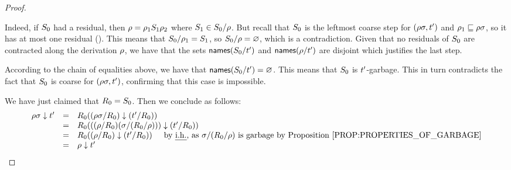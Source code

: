 \begin{proof}
\begin{enumerate}
  Indeed, if $S_0$ had a residual, then $\rho = \rho_1S_1\rho_2$ where $S_1 \in S_0/\rho$.
  But recall that $S_0$ is the leftmost coarse step for $(\rho\sigma,t')$ and
  $\rho_1 \sqsubseteq \rho\sigma$, so it has at most one residual ().
  This means that $S_0/\rho_1 = S_1$, so $S_0/\rho = \varnothing$, which is a contradiction.
  Given that no residuals of $S_0$ are contracted along the derivation $\rho$,
  we have that the sets $\mathsf{names}(S_0/t')$ and $\mathsf{names}(\rho/t')$ are disjoint
  which justifies the last step.
  
  According to the chain of equalities above, we have that $\mathsf{names}(S_0/t') = \varnothing$.
  This means that $S_0$ is $t'$-garbage.
  This in turn contradicts the fact that $S_0$ is coarse for $(\rho\sigma,t')$,
  confirming that this case is impossible.
\end{enumerate}
We have just claimed that $R_0 = S_0$. Then we conclude as follows:
\[
  \begin{array}{rcll}
  \redseq\redseqtwo \sieve \tm'
  & = & \redex_0((\redseq\redseqtwo/\redex_0) \sieve (\tm'/\redex_0)) \\
  & = & \redex_0(((\redseq/\redex_0)(\redseqtwo/(\redex_0/\redseq))) \sieve (\tm'/\redex_0)) \\
  & = & \redex_0((\redseq/\redex_0) \sieve (\tm'/\redex_0)) \HS\text{by \ih, as $\redseqtwo/(\redex_0/\redseq)$ is garbage by \rprop{properties_of_garbage}} \\
  & = & \redseq \sieve \tm' \\
  \end{array}
\]
\end{proof}

